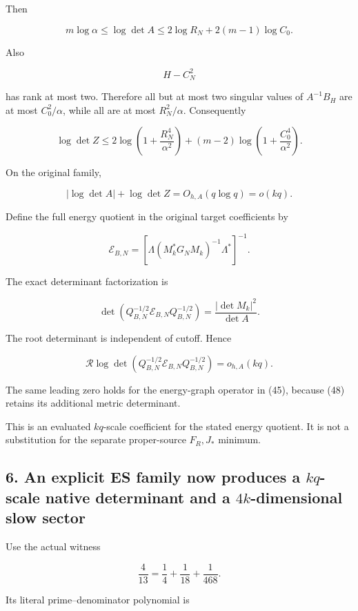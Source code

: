 \documentclass[11pt]{article}
\begin{document}
Then

\[
m\log\alpha
\le\log\det A
\le2\log R_N+2(m-1)\log C_0.
\tag{47}
\]

Also

\[
H-C_N^2
\]

has rank at most two. Therefore all but at most two singular values of \(A^{-1}B_H\) are at most \(C_0^2/\alpha\), while all are at most \(R_N^2/\alpha\). Consequently

\[
\boxed{
\log\det Z
\le
2\log\left(1+\frac{R_N^4}{\alpha^2}\right)
+(m-2)\log\left(1+\frac{C_0^4}{\alpha^2}\right).
}
\tag{48}
\]

On the original family,

\[
|\log\det A|+\log\det Z=O_{h,A}(q\log q)=o(kq).
\]

Define the full energy quotient in the original target coefficients by

\[
\mathcal E_{B,N}
=
\left[
\Lambda(M_k^*G_NM_k)^{-1}\Lambda^*
\right]^{-1}.
\]

The exact determinant factorization is

\[
\det(Q_{B,N}^{-1/2}\mathcal E_{B,N}Q_{B,N}^{-1/2})
=\frac{|\det M_k|^2}{\det A}.
\]

The root determinant is independent of cutoff. Hence

\[
\boxed{
\mathcal R\log\det
(Q_{B,N}^{-1/2}\mathcal E_{B,N}Q_{B,N}^{-1/2})
=o_{h,A}(kq).
}
\tag{49}
\]

The same leading zero holds for the energy-graph operator in (45), because (48) retains its additional metric determinant.

This is an evaluated \(kq\)-scale coefficient for the stated energy quotient. It is not a substitution for the separate proper-source \(F_R,J_*\) minimum.

\subsection{\texorpdfstring{6. An explicit ES family now produces a \(kq\)-scale native determinant and a \(4k\)-dimensional slow sector}{6. An explicit ES family now produces a kq-scale native determinant and a 4k-dimensional slow sector}}\label{an-explicit-es-family-now-produces-a-kq-scale-native-determinant-and-a-4k-dimensional-slow-sector}

Use the actual witness

\[
\frac4{13}=\frac14+\frac1{18}+\frac1{468}.
\]

Its literal prime--denominator polynomial is
\end{document}
